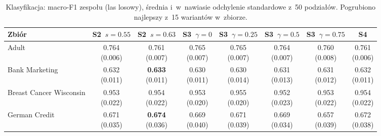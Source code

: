{\scriptsize\setlength{\tabcolsep}{1.5pt}
\begin{longtable}{lccccccc}
\caption{Klasyfikacja: macro-F1 zespołu (las losowy), średnia i~w~nawiasie odchylenie standardowe z~50 podziałów. Pogrubiono najlepszy z~15 wariantów w~zbiorze.}\\
\toprule
\textbf{Zbiór} & S2~$s=0.55$ & S2~$s=0.63$ & S3~$\gamma=0$ & S3~$\gamma=0.25$ & S3~$\gamma=0.5$ & S3~$\gamma=0.75$ & S4 \\
\midrule
\endhead
Adult & \makecell{0.764\\{\tiny (0.006)}} & \makecell{0.761\\{\tiny (0.007)}} & \makecell{0.765\\{\tiny (0.007)}} & \makecell{0.765\\{\tiny (0.007)}} & \makecell{0.764\\{\tiny (0.007)}} & \makecell{0.760\\{\tiny (0.008)}} & \makecell{0.761\\{\tiny (0.006)}} \\
Bank Marketing & \makecell{0.632\\{\tiny (0.011)}} & \makecell{\textbf{0.633}\\{\tiny (0.011)}} & \makecell{0.630\\{\tiny (0.011)}} & \makecell{0.630\\{\tiny (0.014)}} & \makecell{0.631\\{\tiny (0.013)}} & \makecell{0.631\\{\tiny (0.012)}} & \makecell{0.632\\{\tiny (0.011)}} \\
Breast Cancer Wisconsin & \makecell{0.953\\{\tiny (0.022)}} & \makecell{0.954\\{\tiny (0.022)}} & \makecell{0.953\\{\tiny (0.020)}} & \makecell{0.955\\{\tiny (0.020)}} & \makecell{0.952\\{\tiny (0.023)}} & \makecell{0.953\\{\tiny (0.022)}} & \makecell{0.954\\{\tiny (0.022)}} \\
German Credit & \makecell{0.671\\{\tiny (0.035)}} & \makecell{\textbf{0.674}\\{\tiny (0.036)}} & \makecell{0.669\\{\tiny (0.040)}} & \makecell{0.671\\{\tiny (0.039)}} & \makecell{0.669\\{\tiny (0.034)}} & \makecell{0.657\\{\tiny (0.039)}} & \makecell{0.672\\{\tiny (0.038)}} \\

\end{longtable}}
